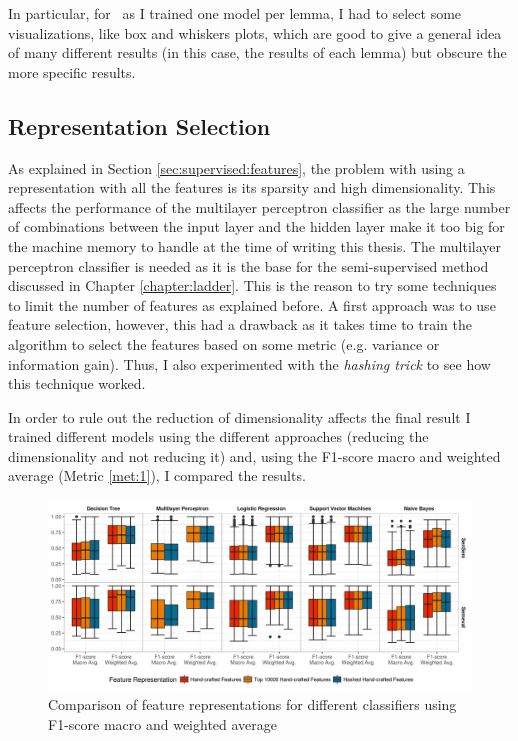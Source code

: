 In particular, for \vsd~as I trained one model per lemma, I had to select some
visualizations, like box and whiskers plots, which are good to give a general
idea of many different results (in this case, the results of each lemma) but
obscure the more specific results.

\subsection{Representation Selection}\label{sec:supervised:representation:selection}

As explained in Section \ref{sec:supervised:features}, the problem with using a
representation with all the features is its sparsity and high dimensionality.
This affects the performance of the multilayer perceptron classifier as the
large number of combinations between the input layer and the hidden layer make
it too big for the machine memory to handle at the time of writing this thesis.
The multilayer perceptron classifier is needed as it is the base for the
semi-supervised method discussed in Chapter \ref{chapter:ladder}. This is the
reason to try some techniques to limit the number of features as explained
before. A first approach was to use feature selection, however, this had a
drawback as it takes time to train the algorithm to select the features based
on some metric (e.g. variance or information gain). Thus, I also experimented
with the {\em hashing trick} to see how this technique worked.

In order to rule out the reduction of dimensionality affects the final result I
trained different models using the different approaches (reducing the
dimensionality and not reducing it) and, using the F1-score macro and weighted
average (Metric \ref{met:1}), I compared the results.

\begin{figure}[ht]
	\includegraphics[width=\textwidth]{plots/supervised/representation_comparison}
  \caption{Comparison of feature representations for different classifiers
  using F1-score macro and weighted average}
  \label{fig:supervised:representations}
\end{figure}

